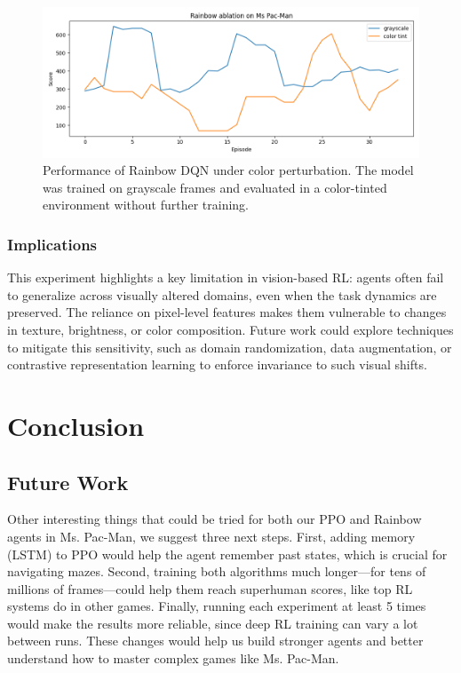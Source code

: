 \documentclass{article}
\begin{document}
\begin{figure}[h]
    \centering
    \includegraphics[width=\linewidth]{color_robustness.png}
    \caption{Performance of Rainbow DQN under color perturbation. The model was trained on grayscale frames and evaluated in a color-tinted environment without further training.}
    \label{fig:color_robustness}
\end{figure}

\subsubsection*{Implications}

This experiment highlights a key limitation in vision-based RL: agents often fail to generalize across visually altered domains, even when the task dynamics are preserved. The reliance on pixel-level features makes them vulnerable to changes in texture, brightness, or color composition. Future work could explore techniques to mitigate this sensitivity, such as domain randomization, data augmentation, or contrastive representation learning to enforce invariance to such visual shifts.

\section{Conclusion}


\subsection{Future Work}
Other interesting things that could be tried for both our PPO and Rainbow agents in Ms. Pac-Man, we suggest three next steps. First, adding memory (LSTM) to PPO would help the agent remember past states, which is crucial for navigating mazes. Second, training both algorithms much longer—for tens of millions of frames—could help them reach superhuman scores, like top RL systems do in other games. Finally, running each experiment at least 5 times would make the results more reliable, since deep RL training can vary a lot between runs. These changes would help us build stronger agents and better understand how to master complex games like Ms. Pac-Man.



\end{document}
